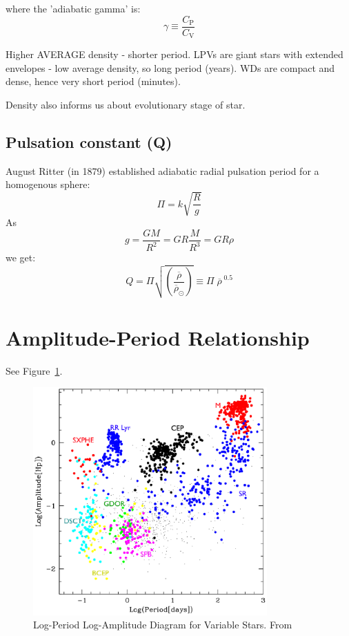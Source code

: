 \documentclass{spy}
\begin{document}
where the 'adiabatic gamma' is:
\begin{equation}
    \gamma \equiv \frac{C_\mathrm{P}}{C_\mathrm{V}}
\end{equation}

Higher AVERAGE density - shorter period. LPVs are giant stars with extended envelopes - low average density, so long period (years). WDs are compact and dense, hence  very short period (minutes). 

Density also informs us about evolutionary stage of star. 

\subsection{Pulsation constant (Q)}
August Ritter (in 1879) established adiabatic radial pulsation period for a homogenous sphere:
\begin{equation}
    \Pi = k \sqrt{\frac{R}{g}}
\end{equation}
As
\begin{equation}
    g = \frac{GM}{R^2} = GR\frac {M}{R^3} = GR\rho
\end{equation}
we get:
\begin{equation}
    Q = \Pi \sqrt{\left(\frac{\overline{\rho}}{\overline{\rho}_\odot}\right)} \equiv \Pi \; \overline{\rho}^{\;0.5}
    \label{pulsation_constant}
\end{equation}



\section{Amplitude-Period Relationship}
See Figure~\ref{period_amp_diagram}.

\begin{figure}[ht]
    \centering
    \includegraphics[width=0.8\textwidth]{period_amplitude.eps}
    \caption{Log-Period Log-Amplitude Diagram for Variable Stars. From \citet{eyerVariableStarsObservational2008}}
    \label{period_amp_diagram}
\end{figure}
\end{document}

